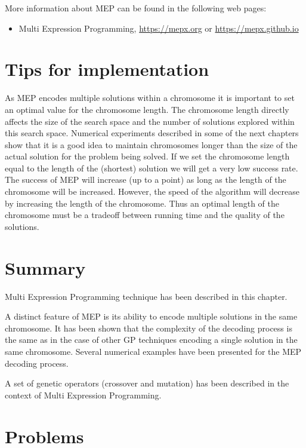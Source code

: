 \documentclass [11pt]{article}
\begin{document}
More information about MEP can be found in the following web pages:

\begin{itemize}

\item{Multi Expression Programming, \url{https://mepx.org} or \url{https://mepx.github.io}}

\end{itemize}


\section{Tips for implementation}
\label{MEP_tips}

As MEP encodes multiple solutions within a chromosome it is important to set an optimal value for the chromosome length. The chromosome length directly affects the size of the search space and the number of solutions explored within this search space. Numerical experiments described in some of the next chapters show that it is a good idea to maintain chromosomes longer than the size of the actual solution for the problem being solved. If we set the chromosome length equal to the length of the (shortest) solution we will get a very low success rate. The success of MEP will increase (up to a point) as long as the length of the chromosome will be increased. However, the speed of the algorithm will decrease by increasing the length of the chromosome. Thus an optimal length of the chromosome must be a tradeoff between running time and the quality of the solutions.


\section{Summary}
\label{mep_summary}

Multi Expression Programming technique has been described in this chapter. 

A distinct feature of MEP is its ability to encode multiple solutions in the same chromosome. It has been shown that the complexity of the decoding process is the same as in the case of other GP techniques encoding a single solution in the same chromosome. Several numerical examples have been presented for the MEP decoding process.

A set of genetic operators (crossover and mutation) has been described in the context of Multi Expression Programming.


\section*{Problems}
\label{MEP_problems}
\end{document}
